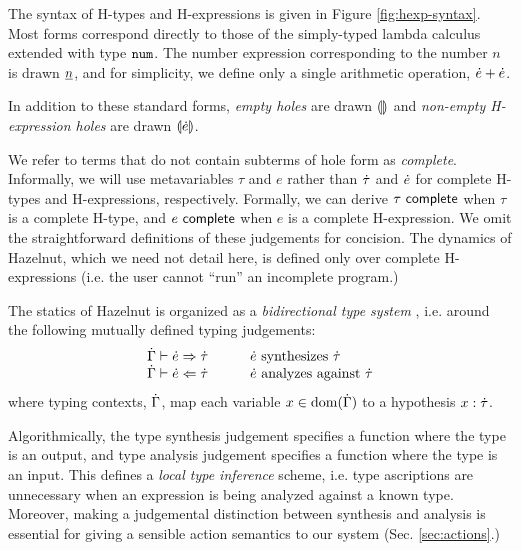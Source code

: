 \documentclass{llncs}
\begin{document}
The syntax of H-types and H-expressions is given in Figure \ref{fig:hexp-syntax}. Most forms correspond directly to those of the simply-typed lambda calculus extended with type $\texttt{num}$. The number expression corresponding to the number $n$ is drawn $\underline{n}$, and for simplicity, we define only a single arithmetic operation, $\dot{e} + \dot{e}$.

In addition to these standard forms, \emph{empty holes} are drawn $\llparenthesis\rrparenthesis$ and \emph{non-empty H-expression holes} are drawn $\llparenthesis\dot{e}\rrparenthesis$. %

We refer to terms that do not contain subterms of hole form as \emph{complete}. Informally, we will use metavariables $\tau$ and $e$ rather than $\dot{\tau}$ and $\dot{e}$ for complete H-types and H-expressions, respectively. Formally, we can derive $\tau~\mathsf{complete}$ when $\tau$ is a complete H-type, and $e~\mathsf{complete}$ when $e$ is a complete H-expression. We omit the straightforward definitions of these judgements for concision. The dynamics of Hazelnut, which we need not detail here, is defined only  over complete H-expressions (i.e. the user cannot ``run'' an incomplete program.)

The statics of Hazelnut is organized as a \emph{bidirectional type system} \cite{Pierce:2000:LTI:345099.345100}, i.e. around the following mutually defined typing judgements:
\[\arraycolsep=15pt\begin{array}{ll}
\hsyn{\hGamma}{\hexp}{\htau} & \text{$\hexp$ synthesizes $\htau$}\\
\hana{\hGamma}{\hexp}{\htau} & \text{$\hexp$ analyzes against $\htau$}
\end{array}\]
where typing contexts, $\dot{\Gamma}$, map each variable $x \in \text{dom}(\dot{\Gamma})$ to a hypothesis $x : \dot{\tau}$.

Algorithmically, the type synthesis judgement specifies a function where the type is an output, and type analysis judgement specifies a function where the type is an input. This defines a \emph{local type inference} scheme, i.e. type ascriptions are unnecessary when an expression is being analyzed against a known type. Moreover, making a judgemental distinction between synthesis and analysis is essential for giving a sensible action semantics to our system (Sec. \ref{sec:actions}.)

\end{document}
